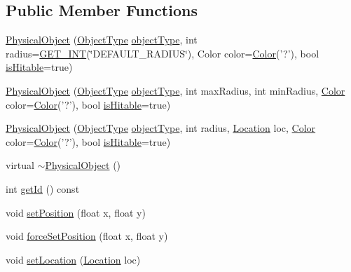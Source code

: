 \subsection*{Public Member Functions}
\begin{DoxyCompactItemize}
\item 
\hyperlink{classPhysicalObject_a2fbf277629a4b9dec946be7241d034f4}{Physical\-Object} (\hyperlink{PhysicalObject_8h_a842c5e2e69277690b064bf363c017980}{Object\-Type} \hyperlink{classPhysicalObject_a59060233e54004b24fc03ed786b46dd3}{object\-Type}, int radius=\hyperlink{configuration_8h_ad074a97012cd402b5c71597589d1fcc2}{G\-E\-T\-\_\-\-I\-N\-T}(\char`\"{}D\-E\-F\-A\-U\-L\-T\-\_\-\-R\-A\-D\-I\-U\-S\char`\"{}), Color color=\hyperlink{structColor}{Color}('?'), bool \hyperlink{classPhysicalObject_a5afc803dac6415f86fcda81983b75e41}{is\-Hitable}=true)
\item 
\hyperlink{classPhysicalObject_a9a132760e19b893b51deb542dc53a859}{Physical\-Object} (\hyperlink{PhysicalObject_8h_a842c5e2e69277690b064bf363c017980}{Object\-Type} \hyperlink{classPhysicalObject_a59060233e54004b24fc03ed786b46dd3}{object\-Type}, int max\-Radius, int min\-Radius, \hyperlink{structColor}{Color} color=\hyperlink{structColor}{Color}('?'), bool \hyperlink{classPhysicalObject_a5afc803dac6415f86fcda81983b75e41}{is\-Hitable}=true)
\item 
\hyperlink{classPhysicalObject_afc9f843a4c6083587ce2e20a091d0a79}{Physical\-Object} (\hyperlink{PhysicalObject_8h_a842c5e2e69277690b064bf363c017980}{Object\-Type} \hyperlink{classPhysicalObject_a59060233e54004b24fc03ed786b46dd3}{object\-Type}, int radius, \hyperlink{structLocation}{Location} loc, \hyperlink{structColor}{Color} color=\hyperlink{structColor}{Color}('?'), bool \hyperlink{classPhysicalObject_a5afc803dac6415f86fcda81983b75e41}{is\-Hitable}=true)
\item 
virtual \hyperlink{classPhysicalObject_a473fb6a285d967b295e4c700c341afe4}{$\sim$\-Physical\-Object} ()
\item 
int \hyperlink{classPhysicalObject_a71514ab30d4543a2720fd4ac0f3f6401}{get\-Id} () const 
\item 
void \hyperlink{classPhysicalObject_ac130b3a86fa816eee60783e0120b7d98}{set\-Position} (float x, float y)
\item 
void \hyperlink{classPhysicalObject_a9c562fb0b7e468d4b6d9a1a429791236}{force\-Set\-Position} (float x, float y)
\item 
void \hyperlink{classPhysicalObject_a0ffd9a9890787fdcfe31ebbf2931aff5}{set\-Location} (\hyperlink{structLocation}{Location} loc)

\end{DoxyCompactItemize}
